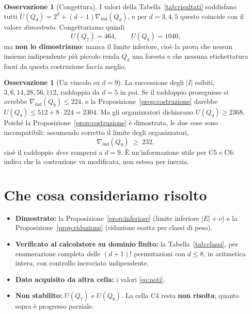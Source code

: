 \documentclass[11pt,a4paper]{article}
\theoremstyle{plain}
\theoremstyle{definition}
\newtheorem{remark}[proposition]{Osservazione}
\newcommand{\Qd}{Q_d}
\begin{document}
\begin{remark}[Congettura]
I valori della Tabella~\ref{tab:risultati} soddisfano tutti
$U(\Qd)=2^d+(d-1)\nabla_{\mathrm{ind}}(\Qd)$, e per $d=3,4,5$ questo coincide con
il valore \emph{dimostrato}. Congetturiamo quindi
\[
U(Q_7)=464,\qquad U(Q_8)=1040,
\]
ma \textbf{non lo dimostriamo}: manca il limite inferiore, cioè la prova che
nessun insieme indipendente più piccolo renda $\Qd$ una foresta e che nessuna
etichettatura fuori da questa costruzione faccia meglio.
\end{remark}

\begin{remark}[Un vincolo su $d=9$]
La successione degli $|I|$ esibiti, $3,6,14,28,56,112$, raddoppia da $d=5$ in
poi. Se il
raddoppio proseguisse si avrebbe $\nabla_{\mathrm{ind}}(Q_9)\le224$, e la
Proposizione~\ref{prop:costruzione} darebbe $U(Q_9)\le 512+8\cdot224=2304$. Ma
gli organizzatori dichiarano $U(Q_9)\ge2368$. Poiché la
Proposizione~\ref{prop:costruzione} è dimostrata, le due cose sono
incompatibili: assumendo corretto il limite degli organizzatori,
\[
\nabla_{\mathrm{ind}}(Q_9)\;\ge\;232,
\]
cioè il raddoppio \emph{deve} rompersi a $d=9$. È un'informazione utile per C5 e
C6: indica che la costruzione va modificata, non estesa per inerzia.
\end{remark}

\section{Che cosa consideriamo risolto}

\begin{itemize}
\item \textbf{Dimostrato:} la Proposizione~\ref{prop:inferiore}
(limite inferiore $|E|+\nu$) e la Proposizione~\ref{prop:riduzione}
(riduzione esatta per classi di peso).
\item \textbf{Verificato al calcolatore su dominio finito:} la
Tabella~\ref{tab:classi}, per enumerazione completa delle $(d+1)!$ permutazioni
con $d\le8$, in aritmetica intera, con controllo incrociato indipendente.
\item \textbf{Dato acquisito da altra cella:} i valori \eqref{eq:noti}.
\item \textbf{Non stabilito:} $U(Q_7)$ e $U(Q_8)$. La cella C4 resta
\textbf{non risolta}; quanto sopra è progresso parziale.
\end{itemize}
\end{document}
